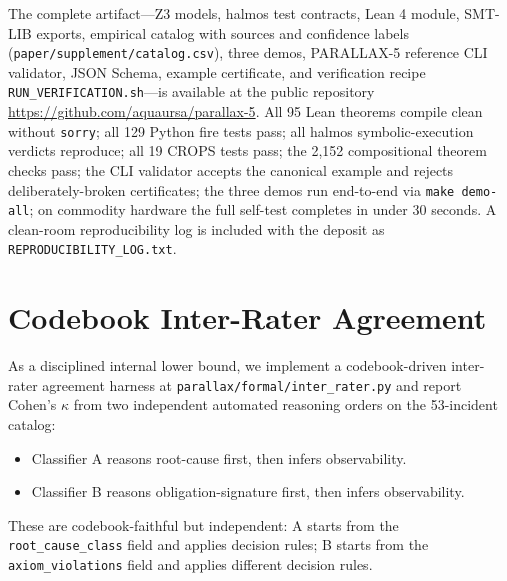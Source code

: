 \documentclass[11pt,a4paper]{article}
\begin{document}
The complete artifact---Z3 models, halmos test contracts, Lean 4 module, SMT-LIB exports, empirical catalog with sources and confidence labels (\texttt{paper/supplement/catalog.csv}), three demos, PARALLAX-5 reference CLI validator, JSON Schema, example certificate, and verification recipe \texttt{RUN\_VERIFICATION.sh}---is available at the public repository \url{https://github.com/aquaursa/parallax-5}. All 95 Lean theorems compile clean without \texttt{sorry}; all 129 Python fire tests pass; all halmos symbolic-execution verdicts reproduce; all 19 CROPS tests pass; the 2{,}152 compositional theorem checks pass; the CLI validator accepts the canonical example and rejects deliberately-broken certificates; the three demos run end-to-end via \texttt{make demo-all}; on commodity hardware the full self-test completes in under 30 seconds. A clean-room reproducibility log is included with the deposit as \texttt{REPRODUCIBILITY\_LOG.txt}.




\clearpage

\section{Codebook Inter-Rater Agreement}\label{sec:inter-rater}

As a disciplined internal lower bound, we implement a codebook-driven inter-rater agreement harness at \texttt{parallax/formal/inter\_rater.py} and report Cohen's $\kappa$ from two independent automated reasoning orders on the 53-incident catalog:

\begin{itemize}
\item Classifier A reasons root-cause first, then infers observability.
\item Classifier B reasons obligation-signature first, then infers observability.
\end{itemize}

These are codebook-faithful but independent: A starts from the \texttt{root\_cause\_class} field and applies decision rules; B starts from the \texttt{axiom\_violations} field and applies different decision rules.
\end{document}
